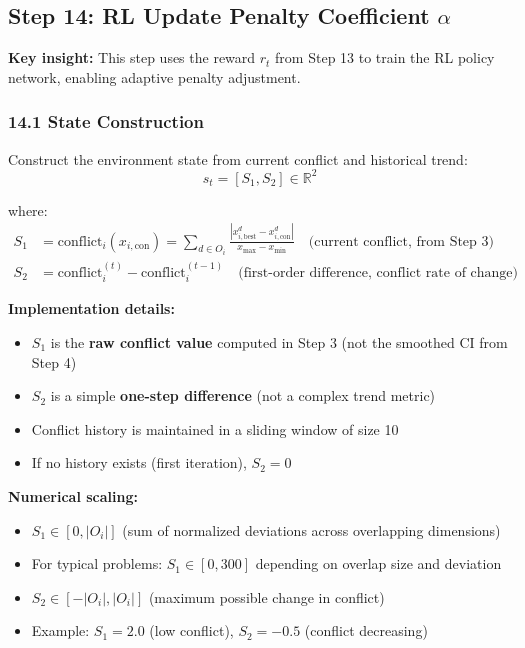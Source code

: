 \documentclass[11pt,a4paper]{article}
\begin{document}
\begin{itemize}
\subsection{Step 14: RL Update Penalty Coefficient $\alpha$}
\textbf{Key insight:} This step uses the reward $r_t$ from Step 13 to train the RL policy network, enabling adaptive penalty adjustment.

\subsubsection*{14.1 State Construction}
Construct the environment state from current conflict and historical trend:
\begin{equation}
s_t = [S_1, S_2] \in \mathbb{R}^2
\end{equation}

where:
\begin{align}
S_1 &= \text{conflict}_i(x_{i,\text{con}}) = \sum_{d \in O_i} \frac{|x_{i,\text{best}}^d - x_{i,\text{con}}^d|}{x_{\max} - x_{\min}} \quad \text{(current conflict, from Step 3)} \\
S_2 &= \text{conflict}_i^{(t)} - \text{conflict}_i^{(t-1)} \quad \text{(first-order difference, conflict rate of change)}
\end{align}

\textbf{Implementation details:}
\begin{itemize}
    \item $S_1$ is the \textbf{raw conflict value} computed in Step 3 (not the smoothed CI from Step 4)
    \item $S_2$ is a simple \textbf{one-step difference} (not a complex trend metric)
    \item Conflict history is maintained in a sliding window of size 10
    \item If no history exists (first iteration), $S_2 = 0$
\end{itemize}

\textbf{Numerical scaling:}
\begin{itemize}
    \item $S_1 \in [0, |O_i|]$ (sum of normalized deviations across overlapping dimensions)
    \item For typical problems: $S_1 \in [0, 300]$ depending on overlap size and deviation
    \item $S_2 \in [-|O_i|, |O_i|]$ (maximum possible change in conflict)
    \item Example: $S_1 = 2.0$ (low conflict), $S_2 = -0.5$ (conflict decreasing)
\end{itemize}


\end{itemize}
\end{document}
